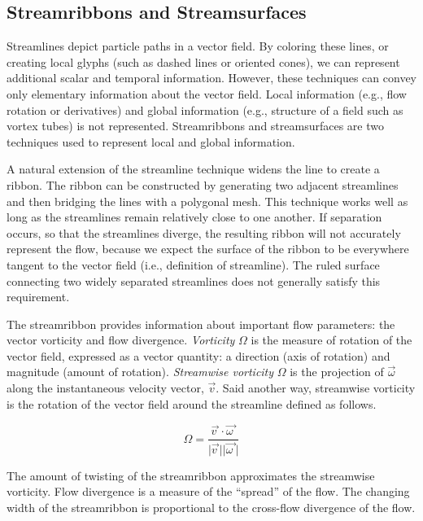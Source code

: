 \subsection{Streamribbons and Streamsurfaces}

Streamlines depict particle paths in a vector field. By coloring these lines, or creating local glyphs (such as dashed lines or oriented cones), we can represent additional scalar and temporal information. However, these techniques can convey only elementary information about the vector field. Local information (e.g., flow rotation or derivatives) and global information (e.g., structure of a field such as vortex tubes) is not represented. Streamribbons and streamsurfaces are two techniques used to represent local and global information.

A natural extension of the streamline technique widens the line to create a ribbon. The ribbon can be constructed by generating two adjacent streamlines and then bridging the lines with a polygonal mesh. This technique works well as long as the streamlines remain relatively close to one another. If separation occurs, so that the streamlines diverge, the resulting ribbon will not accurately represent the flow, because we expect the surface of the ribbon to be everywhere tangent to the vector field (i.e., definition of streamline). The ruled surface connecting two widely separated streamlines does not generally satisfy this requirement.

The streamribbon provides information about important flow parameters: the vector vorticity and flow divergence. \emph{Vorticity} $\Omega$ is the measure of rotation of the vector field, expressed as a vector quantity: a direction (axis of rotation) and magnitude (amount of rotation). \emph{Streamwise vorticity} $\Omega$ is the projection of $\overrightarrow{\omega}$ along the instantaneous velocity vector, $\overrightarrow{v}$. Said another way, streamwise vorticity is the rotation of the vector field around the streamline defined as follows.

\begin{equation}\label{eq:9.3}
\Omega = \frac{\overrightarrow{v\ } \cdot \overrightarrow{\omega\ }}{\vert \overrightarrow{v\ } \vert \vert \overrightarrow{\omega\ } \vert}
\end{equation}

The amount of twisting of the streamribbon approximates the streamwise vorticity. Flow divergence is a measure of the ``spread'' of the flow. The changing width of the streamribbon is proportional to the cross-flow divergence of the flow.

